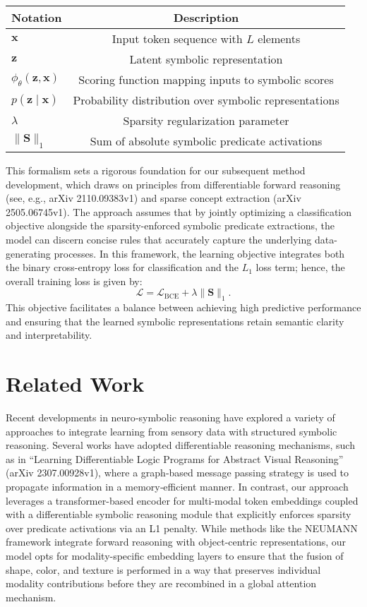 \documentclass{article}
\begin{document}
\begin{table}[h]
\centering
\begin{tabular}{lc}
\hline
Notation & Description \\
\hline
\(\mathbf{x}\) & Input token sequence with \(L\) elements \\
\(\mathbf{z}\) & Latent symbolic representation \\
\(\phi_\theta(\mathbf{z}, \mathbf{x})\) & Scoring function mapping inputs to symbolic scores \\
\(p(\mathbf{z}\mid\mathbf{x})\) & Probability distribution over symbolic representations \\
\(\lambda\) & Sparsity regularization parameter \\
\(\|\mathbf{S}\|_1\) & Sum of absolute symbolic predicate activations \\
\hline
\end{tabular}
\label{tab:notation}
\end{table}

This formalism sets a rigorous foundation for our subsequent method development, which draws on principles from differentiable forward reasoning (see, e.g., arXiv 2110.09383v1) and sparse concept extraction (arXiv 2505.06745v1). The approach assumes that by jointly optimizing a classification objective alongside the sparsity-enforced symbolic predicate extractions, the model can discern concise rules that accurately capture the underlying data-generating processes. In this framework, the learning objective integrates both the binary cross-entropy loss for classification and the \(L_1\) loss term; hence, the overall training loss is given by:
\[
\mathcal{L} = \mathcal{L}_{\text{BCE}} + \lambda \|\mathbf{S}\|_1.
\]
This objective facilitates a balance between achieving high predictive performance and ensuring that the learned symbolic representations retain semantic clarity and interpretability.

\section{Related Work}
Recent developments in neuro‐symbolic reasoning have explored a variety of approaches to integrate learning from sensory data with structured symbolic reasoning. Several works have adopted differentiable reasoning mechanisms, such as in “Learning Differentiable Logic Programs for Abstract Visual Reasoning” (arXiv 2307.00928v1), where a graph‐based message passing strategy is used to propagate information in a memory‐efficient manner. In contrast, our approach leverages a transformer-based encoder for multi-modal token embeddings coupled with a differentiable symbolic reasoning module that explicitly enforces sparsity over predicate activations via an L1 penalty. While methods like the NEUMANN framework integrate forward reasoning with object-centric representations, our model opts for modality-specific embedding layers to ensure that the fusion of shape, color, and texture is performed in a way that preserves individual modality contributions before they are recombined in a global attention mechanism.
\end{document}
